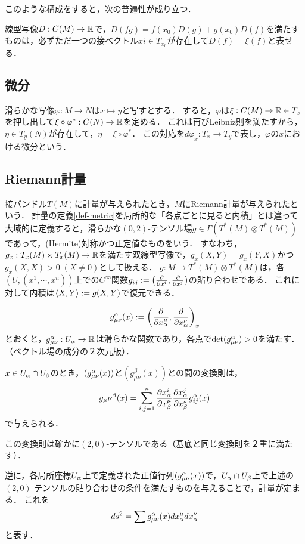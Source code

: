 \documentclass[uplatex,dvipdfmx]{jsreport}
\begin{document}
このような構成をすると，次の普遍性が成り立つ．

\begin{theorem}
    線型写像$D:C(M)\to\mathbb{R}$で，$D(fg)=f(x_0)D(g)+g(x_0)D(f)$を満たすものは，必ずただ一つの接ベクトル$xi\in T_{x_0}$が存在して$D(f)=\xi(f)$と表せる．
\end{theorem}

\subsection{微分}

\begin{definition}
    滑らかな写像$\varphi:M\to N$は$x\mapsto y$と写すとする．
    すると，$\varphi$は$\xi:C(M)\to\mathbb{R}\in T_x$を押し出して$\xi\circ\varphi^*:C(N)\to\mathbb{R}$を定める．
    これは再びLeibniz則を満たすから，$\eta\in T_y(N)$が存在して，$\eta=\xi\circ\varphi^*$．
    この対応を$d\varphi_x:T_x\to T_y$で表し，$\varphi$の$x$における微分という．
\end{definition}

\subsection{Riemann計量}

接バンドル$T(M)$に計量が与えられたとき，$M$にRiemann計量が与えられたという．
計量の定義\ref{def-metric}を局所的な「各点ごとに見ると内積」とは違って大域的に定義すると，滑らかな$(0,2)$-テンソル場$g\in\Gamma(T^*(M)\otimes T^*(M))$であって，(Hermite)対称かつ正定値なものをいう．
すなわち，$g_x:T_x(M)\times T_x(M)\to\mathbb{R}$を満たす双線型写像で，$g_x(X,Y)=g_x(Y,X)$かつ$g_x(X,X)>0\;(X\ne 0)$として扱える．
$g:M\to T^*(M)\otimes T^*(M)$は，各$(U,(x^1,\cdots,x^n))$上での$C^\infty$関数$g_{ij}:=\left(\frac{\partial }{\partial x^i},\frac{\partial }{\partial x^j}\right)$の貼り合わせである．
これに対して内積は$\langle X,Y\rangle:=g(X,Y)$で復元できる．

\[g_{\mu\nu}^\alpha(x):=\left(\frac{\partial }{\partial x_\alpha^\mu},\frac{\partial }{\partial x^\nu_\alpha}\right)_x\]
とおくと，$g_{\mu\nu}^\alpha:U_\alpha\to\mathbb{R}$は滑らかな関数であり，各点で$\det(g^\alpha_{\mu\nu})>0$を満たす．
（ベクトル場の成分の２次元版）．

$x\in U_\alpha\cap U_\beta$のとき，$(g_{\mu\nu}^\alpha(x))$と$(g_{\mu\nu}^\beta(x))$との間の変換則は，
\[g_\mu\nu^\beta(x)=\sum^n_{i,j=1}\frac{\partial x_\alpha^i}{\partial x_\beta^\mu}\frac{\partial x_\alpha^j}{\partial x^\nu_\beta}g_{ij}^\alpha(x)\]
で与えられる．

この変換則は確かに$(2,0)$-テンソルである（基底と同じ変換則を２重に満たす）．

逆に，各局所座標$U_\alpha$上で定義された正値行列$(g_{\mu\nu}^\alpha(x))$で，$U_\alpha\cap U_\beta$上で上述の$(2,0)$-テンソルの貼り合わせの条件を満たすものを与えることで，計量が定まる．
これを
\[ds^2=\sum g_{\mu\nu}^\alpha(x)dx^\mu_\alpha dx_\alpha^\nu\]
と表す．
\end{document}
